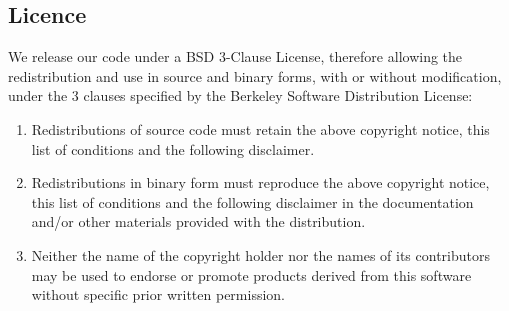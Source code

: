 \documentclass{article}
\begin{document}
\subsection{Licence}
We release our code under a BSD 3-Clause License, therefore allowing the redistribution and use in source and binary forms, with or without
modification, under the 3 clauses specified by the Berkeley Software Distribution License:

\begin{enumerate}
    \item{Redistributions of source code must retain the above copyright notice, this list of conditions and the following disclaimer.
    }
    \item{Redistributions in binary form must reproduce the above copyright notice, this list of conditions and the following disclaimer in the documentation and/or other materials provided with the distribution.}
    
    \item{Neither the name of the copyright holder nor the names of its
    contributors may be used to endorse or promote products derived from
    this software without specific prior written permission.}
\end{enumerate}
\end{document}
